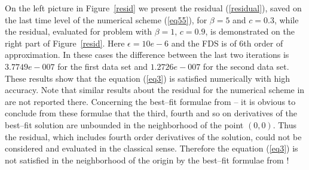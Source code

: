 \documentclass{article}
\newcommand{\rf}[1]{(\ref{#1})}
\begin{document}
On the left picture in Figure~\ref{resid} we present  the residual \rf{residual}, saved on the last time level of the numerical scheme \rf{eq55},  for $\beta = 5$ and $c = 0.3$, while the residual, evaluated for problem with $\beta = 1$, $c = 0.9$, is demonstrated on the right part of Figure~\ref{resid}. Here  $\epsilon =10e-6$ and the FDS is of 6th order of approximation. In these cases the difference between the last two iterations is $3.7749e-007$ for the first data set and $1.2726e-007$ for the second data set. These results show that the  equation \rf{eq3} is satisfied numerically with high accuracy. 
Note that similar results about the residual for the numerical scheme in \cite{Ch2012} are not reported there. Concerning the best--fit formulae from \cite{Ch2011} -- it is obvious to conclude from these formulae that the third, fourth and so on derivatives of the best--fit solution are unbounded in the neighborhood of the point $(0,0)$. Thus  
the residual, which includes fourth order derivatives of the solution, could not be considered and evaluated in the classical sense. Therefore the equation \rf{eq3} is not satisfied in the neighborhood of the origin by the best--fit formulae  from \cite{Ch2011}!
\end{document}
